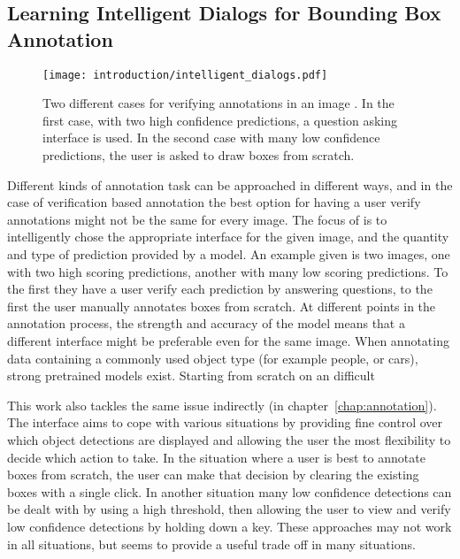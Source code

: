 \subsection{Learning Intelligent Dialogs for Bounding Box Annotation}

\begin{figure}[h]
  \centering
  \texttt{[image: introduction/intelligent\_dialogs.pdf]}
  \caption{Two different cases for verifying annotations in an image \cite{Konyushkova2017}. In the first case, with two high confidence predictions, a question asking interface is used. In the second case with many low confidence predictions, the user is asked to draw boxes from scratch. }
  \label{fig:intelligent_dialogs}
\end{figure}

Different kinds of annotation task can be approached in different ways, and in the case of verification based annotation the best option for having a user verify annotations might not be the same for every image. The focus of \cite{Konyushkova2017} is to intelligently chose the appropriate interface for the given image, and the quantity and type of prediction provided by a model. An example given is two images, one with two high scoring predictions, another with many low scoring predictions. To the first they have a user  verify each prediction by answering questions, to the first the user manually annotates boxes from scratch. At different points in the annotation process, the strength and accuracy of the model means that a different interface might be preferable even for the same image. When annotating data containing a commonly used object type (for example people, or cars), strong pretrained models exist. Starting from scratch on an difficult 

This work also tackles the same issue indirectly (in chapter~\ref{chap:annotation}). The interface aims to cope with various situations by providing fine control over which object detections are displayed and allowing the user the most flexibility to decide which action to take. In the situation where a user is best to annotate boxes from scratch, the user can make that decision by clearing the existing boxes with a single click. In another situation many low confidence detections can be dealt with by using a high threshold, then allowing the user to view and verify low confidence detections by holding down a key. These approaches may not work in all situations, but seems to provide a useful trade off in many situations.









